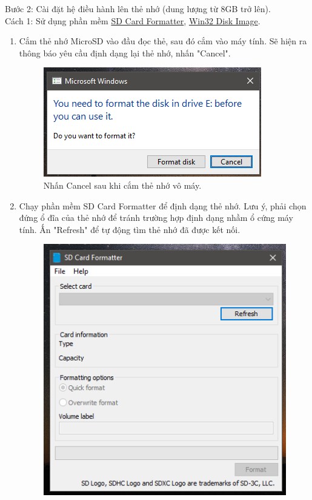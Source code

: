 Bước 2: Cài đặt hệ điều hành lên thẻ nhớ (dung lượng từ 8GB trở lên).\\
\hspace*{0.25cm}Cách 1: Sử dụng phần mềm \href{https://www.sdcard.org/downloads/formatter_4/}{SD Card Formatter}, \href{https://sourceforge.net/projects/win32diskimager/}{Win32 Disk Image}.
\newpage
\begin{enumerate}
\item Cắm thẻ nhớ MicroSD vào đầu đọc thẻ, sau đó cắm vào máy tính. Sẽ hiện ra thông báo yêu cầu định dạng lại thẻ nhớ, nhấn "Cancel".
\begin{center}
\begin{figure}[htp]
\begin{center}
 \includegraphics[scale=0.8]{image3/buoc2cach1s1.png}
\end{center}
\caption{Nhấn Cancel sau khi cắm thẻ nhớ vô máy.}
\label{refhinh1}
\end{figure}
\end{center}
\item Chạy phần mềm SD Card Formatter để định dạng thẻ nhớ. Lưu ý, phải chọn đứng ổ đĩa của thẻ nhớ để tránh trường hợp định dạng nhầm ổ cứng máy tính. Ấn "Refresh" để tự động tìm thẻ nhớ đã được kết nối.
\begin{center}
\begin{figure}[htp]
\begin{center}
\includegraphics[scale=0.75]{image3/buoc2cach1s2.png}

\end{center}
\end{figure}
\end{center}
\end{enumerate}
